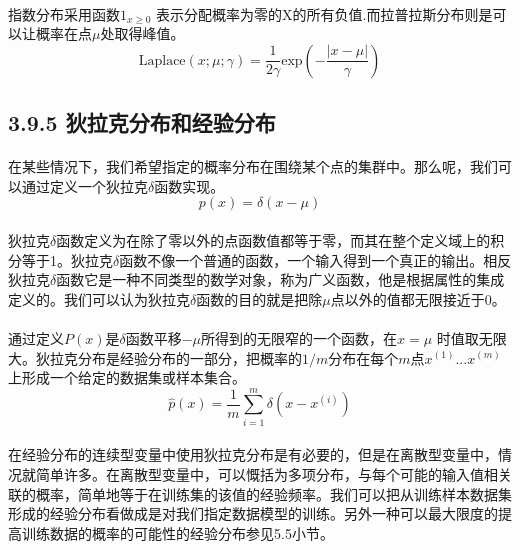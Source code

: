 \documentclass{article}
\begin{document}
    \paragraph{}
    指数分布采用函数$1_{x\geq0}$ 表示分配概率为零的X的所有负值.而拉普拉斯分布则是可以让概率在点$\mu$处取得峰值。
    \begin{equation}
     \mathrm{Laplace}(x;\mu;\gamma)=\frac{1}{2\gamma} \mathrm{exp}(-\frac{|x-\mu|}{\gamma}) \tag{3.26}
    \end{equation}
    \subsection*{3.9.5 狄拉克分布和经验分布}
    \paragraph{}
    在某些情况下，我们希望指定的概率分布在围绕某个点的集群中。那么呢，我们可以通过定义一个狄拉克$\delta$函数实现。
    \begin{equation}
      p(x)=\delta(x-\mu)  \tag{3.27}
    \end{equation}
    \paragraph{}
    狄拉克$\delta$函数定义为在除了零以外的点函数值都等于零，而其在整个定义域上的积分等于1。狄拉克$\delta$函数不像一个普通的函数，一个输入得到一个真正的输出。相反狄拉克$\delta$函数它是一种不同类型的数学对象，称为广义函数，他是根据属性的集成定义的。我们可以认为狄拉克$\delta$函数的目的就是把除$\mu$点以外的值都无限接近于0。
    \paragraph{}
    通过定义$P(x)$是$\delta$函数平移$-\mu$所得到的无限窄的一个函数，在$x=\mu$ 时值取无限大。狄拉克分布是经验分布的一部分，把概率的$1/m$分布在每个$m$点$x^{(1)}...x^{(m)}$上形成一个给定的数据集或样本集合。
    \begin{equation}
     \hat{p}(x)=\frac{1}{m}\sum_{i=1}^{m}\delta(x-x^{(i)}) \tag{3.28}
    \end{equation}
    \paragraph{}
    在经验分布的连续型变量中使用狄拉克分布是有必要的，但是在离散型变量中，情况就简单许多。在离散型变量中，可以慨括为多项分布，与每个可能的输入值相关联的概率，简单地等于在训练集的该值的经验频率。我们可以把从训练样本数据集形成的经验分布看做成是对我们指定数据模型的训练。另外一种可以最大限度的提高训练数据的概率的可能性的经验分布参见5.5小节。
\end{document}
